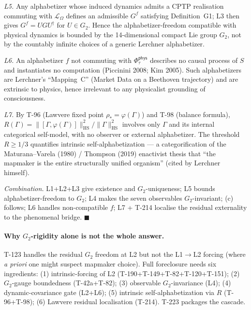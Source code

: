 \textit{L5.} Any alphabetizer whose induced dynamics admits a
CPTP realisation commuting with $\mathcal L_\Omega$ defines an
admissible $G^f$ satisfying Definition~G1; L3 then gives
$G^f = U G U^\dagger$ for $U \in G_2$. Hence the
alphabetizer-freedom compatible with physical dynamics is bounded
by the 14-dimensional compact Lie group $G_2$, not by the
countably infinite choices of a generic Lerchner alphabetizer.

\textit{L6.} An alphabetizer $f$ not commuting with
$\Phi_\tau^{\mathsf{phys}}$ describes no causal process of $S$
and instantiates no computation (Piccinini 2008; Kim 2005). Such
alphabetizers are Lerchner's ``Mapping~C'' (Market Data on a
Beethoven trajectory) and are extrinsic to physics, hence
irrelevant to any physicalist grounding of consciousness.

\textit{L7.} By T-96  (Lawvere fixed point
$\rho_\ast = \varphi(\Gamma)$) and T-98  (balance
formula), $R(\Gamma) = \|[\Gamma,\varphi(\Gamma)]\|_{\mathrm{HS}}^2
/ \|\Gamma\|_{\mathrm{HS}}^2$ involves only $\Gamma$ and its
internal categorical self-model, with no observer or external
alphabetizer. The threshold $R \geq 1/3$ quantifies intrinsic
self-alphabetization --- a categorification of the
Maturana--Varela (1980) / Thompson (2019) enactivist thesis that
``the mapmaker is the entire structurally unified organism''
(cited by Lerchner himself).

\textit{Combination.} L1+L2+L3 give existence and $G_2$-uniqueness;
L5 bounds alphabetizer-freedom to $G_2$; L4 makes the seven
observables $G_2$-invariant; (c) follows; L6 handles
non-compatible $f$; L7 + T-214 localise the residual externality
to the phenomenal bridge. $\blacksquare$

\paragraph{Why $G_2$-rigidity alone is not the whole answer.}
T-123  handles the residual $G_2$ freedom at L2 but
not the L1$\to$L2 forcing (where \emph{a priori} one might
suspect mapmaker choice). Full foreclosure needs six ingredients:
(1) intrinsic-forcing of L2 (T-190+T-149+T-82+T-120+T-151);
(2) $G_2$-gauge boundedness (T-42a+T-82); (3) observable
$G_2$-invariance (L4); (4) dynamic-covariance gate (L2+L6);
(5) intrinsic self-alphabetization via $R$ (T-96+T-98); (6)
Lawvere residual localisation (T-214). T-223 packages the
cascade.

